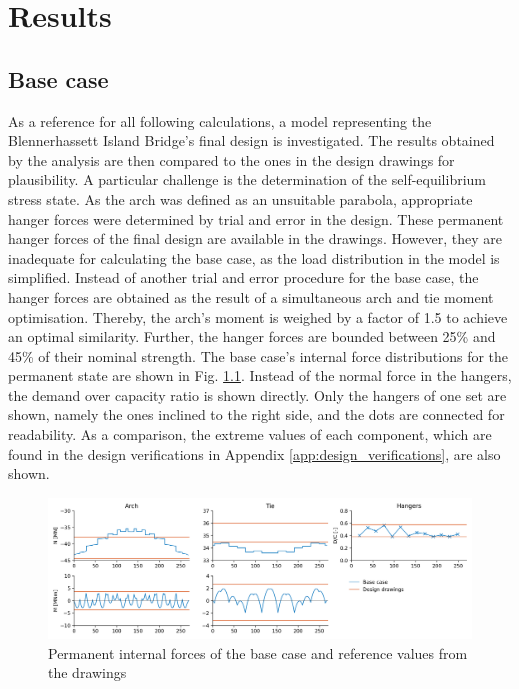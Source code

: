 \chapter{Results}\label{sec:results}

\section{Base case} \label{sec:base_case}
As a reference for all following calculations, a model representing the Blennerhassett Island Bridge's final design is investigated. The results obtained by the analysis are then compared to the ones in the design drawings for plausibility. A particular challenge is the determination of the self-equilibrium stress state. As the arch was defined as an unsuitable parabola, appropriate hanger forces were determined by trial and error in the design. These permanent hanger forces of the final design are available in the drawings. However, they are inadequate for calculating the base case, as the load distribution in the model is simplified. Instead of another trial and error procedure for the base case, the hanger forces are obtained as the result of a simultaneous arch and tie moment optimisation. Thereby, the arch's moment is weighed by a factor of 1.5 to achieve an optimal similarity. Further, the hanger forces are bounded between 25\% and 45\% of their nominal strength. The base case's internal force distributions for the permanent state are shown in Fig. \ref{fig:base_case_permanent}. Instead of the normal force in the hangers, the demand over capacity ratio is shown directly. Only the hangers of one set are shown, namely the ones inclined to the right side, and the dots are connected for readability. As a comparison, the extreme values of each component, which are found in the design verifications in Appendix \ref{app:design_verifications}, are also shown.

\begin{figure}[H]
    \centering
    \includegraphics[width=\textwidth]{calculations/Base case/Permanent state.png}
    \caption{Permanent internal forces of the base case and reference values from the drawings}
    \label{fig:base_case_permanent}
\end{figure}

